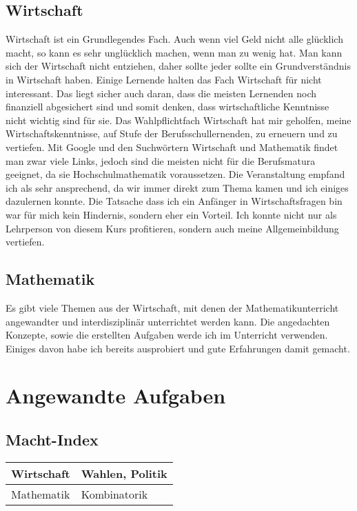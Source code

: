 \documentclass[11pt, twocolumn, a4paper]{scrartcl}
\begin{document}
\subsection{Wirtschaft}
Wirtschaft ist ein Grundlegendes Fach. Auch wenn viel Geld nicht alle glücklich macht, so kann es sehr unglücklich machen, wenn man zu wenig hat. Man kann sich der Wirtschaft nicht entziehen, daher sollte jeder sollte ein Grundverständnis in Wirtschaft haben. Einige Lernende halten das Fach Wirtschaft für nicht interessant. Das liegt sicher auch daran, dass die meisten Lernenden noch finanziell abgesichert sind und somit denken, dass wirtschaftliche Kenntnisse nicht wichtig sind für sie. Das Wahlpflichtfach Wirtschaft hat mir geholfen, meine Wirtschaftskenntnisse, auf Stufe der Berufsschullernenden, zu erneuern und zu vertiefen. Mit Google und den Suchwörtern Wirtschaft und Mathematik findet man zwar viele Links, jedoch sind die meisten nicht für die Berufsmatura geeignet, da sie Hochschulmathematik voraussetzen. Die Veranstaltung empfand ich als sehr ansprechend, da wir immer direkt zum Thema kamen und ich einiges dazulernen konnte. Die Tatsache dass ich ein Anfänger in Wirtschaftsfragen bin war für mich kein Hindernis, sondern eher ein Vorteil. Ich konnte nicht nur als Lehrperson von diesem Kurs profitieren, sondern auch meine Allgemeinbildung vertiefen.
\subsection{Mathematik}
Es gibt viele Themen aus der Wirtschaft, mit denen der Mathematikunterricht angewandter und interdisziplinär unterrichtet werden kann. Die angedachten Konzepte, sowie die erstellten Aufgaben werde ich im Unterricht verwenden. Einiges davon habe ich bereits ausprobiert und gute Erfahrungen damit gemacht. 





\onecolumn
\section{Angewandte Aufgaben}
\subsection{Macht-Index}



\begin{tabular}{l l}
\toprule
Wirtschaft & Wahlen, Politik  \\
\midrule
Mathematik& Kombinatorik \\

\bottomrule
\end{tabular}\\
\end{document}
